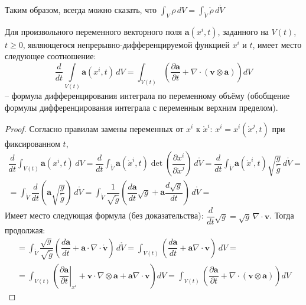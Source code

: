 Таким образом, всегда можно сказать, что $\int_V \rho \, dV = \int_{\mathring{V}} \mathring{\rho} \, d\mathring{V}$

\begin{theorem}
  Для произвольного переменного векторного поля $\mathbf{a} (x^i, t)$, заданного на $V(t)$,
  $t \geqslant 0$, являющегося непрерывно-дифференцируемой функцией $x^i$ и $t$,
  имеет место следующее соотношение:
  \[
    \dfrac{d}{dt} \int\limits_{V(t)} \mathbf{a}(x^i, t) \, dV
    = \int_{V(t)} \left( \dfrac{\partial \mathbf{a}}{\partial t} + \nabla \cdot \left( \mathbf{v} \otimes \mathbf{a} \right)  \right) dV
  \]
  -- формула дифференцирования интеграла по переменному объёму (обобщение формулы
  дифференцирования интеграла с переменным верхним пределом).
\end{theorem}
\begin{proof}
  Согласно правилам замены переменных от $x^i$ к $\mathring{x}^i$: $x^i = x^i(\mathring{x}^j, t)$
  при фиксированном $t$,
  \begin{multline*}
    \dfrac{d}{dt} \int_{V(t)} \mathbf{a}(x^i, t) \, dV
    = \dfrac{d}{dt} \int_{\mathring{V}} \mathbf{a}(\mathring{x}^i, t) \det \left( \dfrac{\partial x^i}{\partial \mathring{x}^j}  \right) \, d\mathring{V}
    = \dfrac{d}{dt} \int_{\mathring{V}} \mathbf{a}(\mathring{x}^i, t) \sqrt{\dfrac{g}{\mathring{g}}} \, d\mathring{V} = \\
    = \int_{\mathring{V}} \dfrac{d}{dt} \left( \mathbf{a} \sqrt{\dfrac{g}{\mathring{g}}} \right) \, d\mathring{V}
    = \int_{\mathring{V}} \dfrac{1}{\sqrt{\mathring{g}}} \left( \dfrac{d\mathbf{a}}{dt}\sqrt{g} + \mathbf{a} \dfrac{d\sqrt{g}}{dt} \right) \, d\mathring{V} = 
  \end{multline*}
  Имеет место следующая формула (без доказательства): $\dfrac{d}{dt}\sqrt{g} = \sqrt{g} \, \nabla \cdot \mathbf{v}$.
  Тогда продолжая:
  \begin{multline*}
    = \int_{\mathring{V}} \dfrac{\sqrt{g}}{\sqrt{\mathring{g}}} \left( \dfrac{d\mathbf{a}}{dt} + \mathbf{a} \cdot \nabla \cdot \mathbf{\mathring{v}} \right) \, d\mathring{V}
    = \int_{V(t)} \left( \dfrac{d \mathbf{a}}{dt} + \mathbf{a} \nabla \cdot \mathbf{v} \right) \, dV = \\
    = \int_{V(t)} \left( \left. \dfrac{\partial \mathbf{a}}{\partial t} \right|_{x^i} 
      + \mathbf{v} \cdot \nabla \otimes \mathbf{a} + \mathbf{a} \nabla \cdot \mathbf{v}\right) dV
    = \int_{V(t)} \left( \dfrac{\partial \mathbf{a}}{\partial t} + \nabla \cdot \left( \mathbf{v} \otimes \mathbf{a} \right)  \right) dV
  \end{multline*}
\end{proof}


